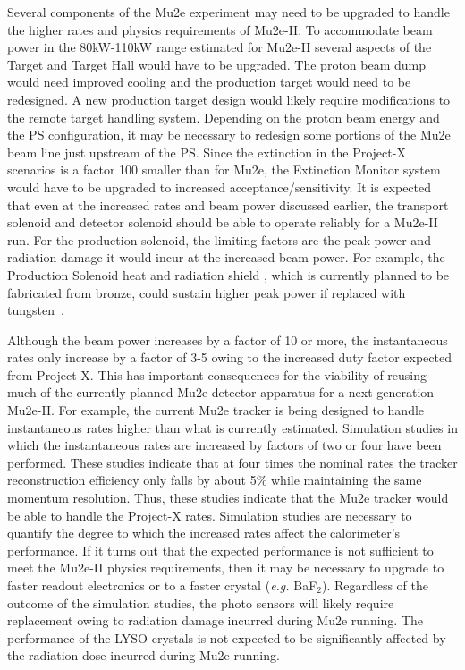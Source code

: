 %

Several components of the Mu2e experiment may need to be upgraded to
handle the higher rates and physics requirements of Mu2e-II.  To
accommodate beam power in the 80kW-110kW range estimated for Mu2e-II
several aspects of the Target and Target Hall would have to be
upgraded.  The proton beam dump would need improved cooling and the
production target would need to be redesigned.  A new production
target design would likely require modifications to the remote target
handling system.  Depending on the proton beam energy and the PS
configuration, it may be necessary to redesign some portions of the
Mu2e beam line just upstream of the PS. Since the extinction in the
Project-X scenarios is a factor 100 smaller than for Mu2e, the
Extinction Monitor system would have to be upgraded to increased
acceptance/sensitivity.  It is expected that even at the increased
rates and beam power discussed earlier, the transport solenoid and
detector solenoid should be able to operate reliably for a Mu2e-II
run. For the production solenoid, the limiting factors are the peak
power and radiation damage it would incur at the increased beam power.
For example, the Production Solenoid heat and radiation shield , which
is currently planned to be fabricated from bronze, could sustain
higher peak power if replaced with tungsten~\cite{Mu2eII}.

Although the beam power increases by a factor of 10 or more, the
instantaneous rates only increase by a factor of 3-5 owing to the
increased duty factor expected from Project-X.  This has important
consequences for the viability of reusing much of the currently
planned Mu2e detector apparatus for a next generation Mu2e-II.  For
example, the current Mu2e tracker is being designed to handle
instantaneous rates higher than what is currently estimated.
Simulation studies in which the instantaneous rates are increased by
factors of two or four have been performed.  These studies indicate
that at four times the nominal rates the tracker reconstruction
efficiency only falls by about 5\% while maintaining the same momentum
resolution.  Thus, these studies indicate that the Mu2e tracker would
be able to handle the Project-X rates.  Simulation studies are
necessary to quantify the degree to which the increased rates affect
the calorimeter's performance.  If it turns out that the expected
performance is not sufficient to meet the Mu2e-II physics
requirements, then it may be necessary to upgrade to faster readout
electronics or to a faster crystal ({\it e.g.} BaF$_2$).  Regardless of the
outcome of the simulation studies, the photo sensors will likely
require replacement owing to radiation damage incurred during Mu2e
running.  The performance of the LYSO crystals is not expected to be
significantly affected by the radiation dose incurred during Mu2e
running.

